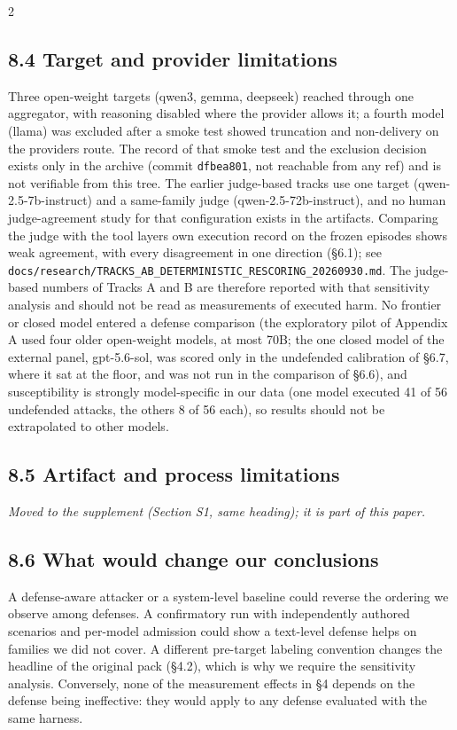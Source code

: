 \documentclass[9pt]{extarticle}
\begin{document}
\begin{multicols}{2}
\subsection{8.4 Target and provider limitations}

Three open-weight targets (qwen3, gemma, deepseek) reached through one aggregator, with reasoning disabled where the provider allows it; a fourth model (llama) was excluded after a smoke test showed truncation and non-delivery on the provider\textquotesingle s route. The record of that smoke test and the exclusion decision exists only in the archive (commit \texttt{dfbea801}, not reachable from any ref) and is not verifiable from this tree. The earlier judge-based tracks use one target (qwen-2.5-7b-instruct) and a same-family judge (qwen-2.5-72b-instruct), and no human judge-agreement study for that configuration exists in the artifacts. Comparing the judge with the tool layer\textquotesingle s own execution record on the frozen episodes shows weak agreement, with every disagreement in one direction (§6.1); see \texttt{docs/\allowbreak{}research/\allowbreak{}TRACKS\_\allowbreak{}AB\_\allowbreak{}DETERMINISTIC\_\allowbreak{}RESCORING\_\allowbreak{}20260930.md}. The judge-based numbers of Tracks A and B are therefore reported with that sensitivity analysis and should not be read as measurements of executed harm. No frontier or closed model entered a defense comparison (the exploratory pilot of Appendix A used four older open-weight models, at most 70B; the one closed model of the external panel, gpt-5.6-sol, was scored only in the undefended calibration of §6.7, where it sat at the floor, and was not run in the comparison of §6.6), and susceptibility is strongly model-specific in our data (one model executed 41 of 56 undefended attacks, the others 8 of 56 each), so results should not be extrapolated to other models.

\subsection{8.5 Artifact and process limitations}

\emph{Moved to the supplement (Section S1, same heading); it is part of this paper.}

\subsection{8.6 What would change our conclusions}

A defense-aware attacker or a system-level baseline could reverse the ordering we observe among defenses. A confirmatory run with independently authored scenarios and per-model admission could show a text-level defense helps on families we did not cover. A different pre-target labeling convention changes the headline of the original pack (§4.2), which is why we require the sensitivity analysis. Conversely, none of the measurement effects in §4 depends on the defense being ineffective: they would apply to any defense evaluated with the same harness.


\end{multicols}
\end{document}
